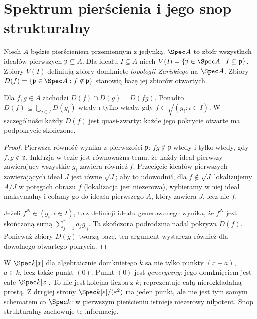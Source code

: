 \section{Spektrum pierścienia i jego snop strukturalny}
\label{sec:spek-snop}

\begin{definicja}[Spektrum]
Niech $A$ będzie pierścieniem przemiennym z jedynką.
$\Spec A$ to zbiór wszystkich ideałów pierwszych
$\mathfrak p\subsetneq A$. Dla ideału $I\subseteq A$
niech $V(I)=\{\mathfrak p\in\Spec A:I\subseteq\mathfrak p\}$.
Zbiory $V(I)$ definiują zbiory domknięte
\emph{topologii Zariskiego} na $\Spec A$.
Zbiory $D(f)=\{\mathfrak p\in\Spec A:f\notin\mathfrak p\}$
stanowią bazę jej zbiorów otwartych.
\end{definicja}

\begin{stwierdzenie}
Dla $f,g\in A$ zachodzi
$D(f)\cap D(g)=D(fg)$. Ponadto
$D(f)\subseteq\bigcup_{i\in I}D(g_i)$ wtedy
i tylko wtedy, gdy $f\in\sqrt{(g_i:i\in I)}$.
W szczególności każdy $D(f)$ jest quasi-zwarty:
każde jego pokrycie otwarte ma podpokrycie skończone.
\end{stwierdzenie}
\begin{proof}
Pierwsza równość wynika z pierwszości
$\mathfrak p$: $fg\notin\mathfrak p$ wtedy
i tylko wtedy, gdy $f,g\notin\mathfrak p$.
Inkluzja w tezie jest równoważna temu, że
każdy ideał pierwszy zawierający wszystkie $g_i$
zawiera również $f$. Przecięcie ideałów pierwszych
zawierających ideał $J$ jest równe $\sqrt J$;
aby to udowodnić, dla $f\notin\sqrt J$ lokalizujemy
$A/J$ w potęgach obrazu $f$ (lokalizacja jest
niezerowa), wybieramy w niej ideał maksymalny
i cofamy go do ideału pierwszego $A$,
który zawiera $J$, lecz nie $f$.

Jeżeli $f^N\in(g_i:i\in I)$, to z definicji
ideału generowanego wynika, że $f^N$ jest
skończoną sumą $\sum_{j=1}^r a_j g_{i_j}$.
Ta skończona podrodzina nadal pokrywa $D(f)$.
Ponieważ zbiory $D(g)$ tworzą bazę, ten argument
wystarcza również dla dowolnego otwartego pokrycia.
\end{proof}

\begin{uwaga}
W $\Spec k[x]$ dla algebraicznie domkniętego $k$
są nie tylko punkty $(x-a)$, $a\in k$, lecz także
punkt $(0)$. Punkt $(0)$ jest \emph{generyczny}:
jego domknięciem jest całe $\Spec k[x]$.
To nie jest kolejna liczba z $k$; reprezentuje
całą nierozkładalną prostą. Z drugiej strony
$\Spec k[\varepsilon]/(\varepsilon^2)$ ma jeden
punkt, ale nie jest tym samym schematem co $\Spec k$:
w pierwszym pierścieniu istnieje niezerowy nilpotent.
Snop strukturalny zachowuje tę informację.
\end{uwaga}

